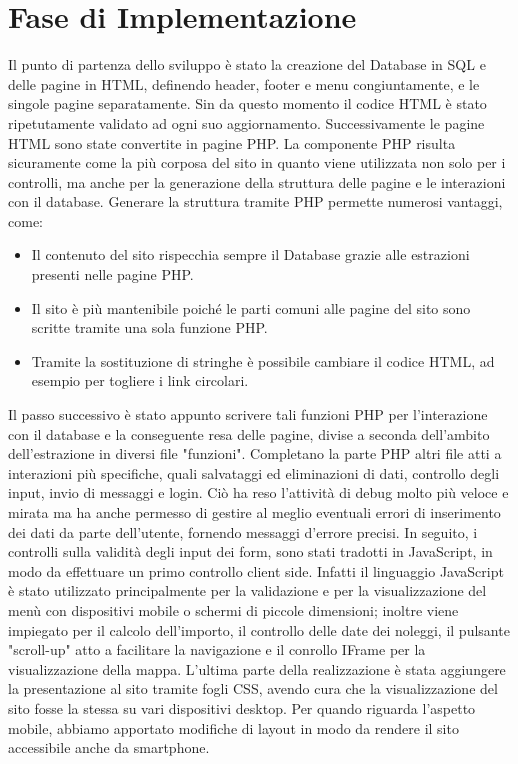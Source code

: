 \section{Fase di Implementazione}

Il punto di partenza dello sviluppo è stato la creazione del Database in SQL e delle pagine in HTML, definendo header, footer e menu congiuntamente, e le singole pagine separatamente. Sin da questo momento il codice HTML è stato ripetutamente validato ad ogni suo aggiornamento. Successivamente le pagine HTML sono state convertite in pagine PHP.
La componente PHP risulta sicuramente come la più corposa del sito in quanto viene utilizzata non solo per i controlli, ma anche per la generazione della struttura delle pagine e le interazioni con il database.
Generare la struttura tramite PHP permette numerosi vantaggi, come:
\begin{itemize}
    \item Il contenuto del sito rispecchia sempre il Database grazie alle estrazioni presenti nelle pagine PHP.
    \item Il sito è più mantenibile poiché le parti comuni alle pagine del sito sono scritte tramite una sola funzione PHP.
    \item Tramite la sostituzione di stringhe è possibile cambiare il codice HTML, ad esempio per togliere i link circolari.
\end{itemize}
Il passo successivo è stato appunto scrivere tali funzioni PHP per l’interazione con il database e la conseguente resa delle pagine, divise a seconda dell'ambito dell'estrazione in diversi file "funzioni". Completano la parte PHP altri file atti a interazioni più specifiche, quali salvataggi ed eliminazioni di dati, controllo degli input, invio di messaggi e login.
Ciò ha reso l’attività di debug molto più veloce e mirata ma ha anche permesso di gestire al meglio eventuali errori di inserimento dei dati da parte dell’utente, fornendo messaggi d’errore precisi. In seguito, i controlli sulla validità degli input dei form, sono stati tradotti in JavaScript, in modo da effettuare un primo controllo client side.
Infatti il linguaggio JavaScript è stato utilizzato principalmente per la validazione e per la visualizzazione del menù con dispositivi mobile o schermi di piccole dimensioni; inoltre viene impiegato per il calcolo dell'importo, il controllo delle date dei noleggi, il pulsante "scroll-up" atto a facilitare la navigazione e il conrollo IFrame per la visualizzazione della mappa.
L’ultima parte della realizzazione è stata aggiungere la presentazione al sito tramite fogli CSS, avendo cura che la visualizzazione del sito fosse la stessa su vari dispositivi desktop. Per quando riguarda l’aspetto mobile, abbiamo apportato modifiche di layout in modo da rendere il sito accessibile anche da smartphone.

\pagebreak
